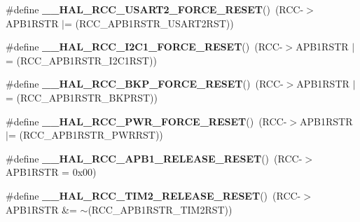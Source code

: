 \begin{DoxyCompactItemize}
\mbox{\label{group___r_c_c___a_p_b1___force___release___reset_gab4de80173ffa0e599baab0e76d562cc3}} 
\#define {\bfseries \+\_\+\+\_\+\+H\+A\+L\+\_\+\+R\+C\+C\+\_\+\+U\+S\+A\+R\+T2\+\_\+\+F\+O\+R\+C\+E\+\_\+\+R\+E\+S\+ET}()~(R\+CC-\/$>$A\+P\+B1\+R\+S\+TR $\vert$= (R\+C\+C\+\_\+\+A\+P\+B1\+R\+S\+T\+R\+\_\+\+U\+S\+A\+R\+T2\+R\+ST))
\item 
\mbox{\label{group___r_c_c___a_p_b1___force___release___reset_ga551c171f88af86ca985db634ac9e3275}} 
\#define {\bfseries \+\_\+\+\_\+\+H\+A\+L\+\_\+\+R\+C\+C\+\_\+\+I2\+C1\+\_\+\+F\+O\+R\+C\+E\+\_\+\+R\+E\+S\+ET}()~(R\+CC-\/$>$A\+P\+B1\+R\+S\+TR $\vert$= (R\+C\+C\+\_\+\+A\+P\+B1\+R\+S\+T\+R\+\_\+\+I2\+C1\+R\+ST))
\item 
\mbox{\label{group___r_c_c___a_p_b1___force___release___reset_ga570b0786a7446c63fd268cb0466f8af3}} 
\#define {\bfseries \+\_\+\+\_\+\+H\+A\+L\+\_\+\+R\+C\+C\+\_\+\+B\+K\+P\+\_\+\+F\+O\+R\+C\+E\+\_\+\+R\+E\+S\+ET}()~(R\+CC-\/$>$A\+P\+B1\+R\+S\+TR $\vert$= (R\+C\+C\+\_\+\+A\+P\+B1\+R\+S\+T\+R\+\_\+\+B\+K\+P\+R\+ST))
\item 
\mbox{\label{group___r_c_c___a_p_b1___force___release___reset_gaf454341fae45fdfacfea2f45c07ce3e0}} 
\#define {\bfseries \+\_\+\+\_\+\+H\+A\+L\+\_\+\+R\+C\+C\+\_\+\+P\+W\+R\+\_\+\+F\+O\+R\+C\+E\+\_\+\+R\+E\+S\+ET}()~(R\+CC-\/$>$A\+P\+B1\+R\+S\+TR $\vert$= (R\+C\+C\+\_\+\+A\+P\+B1\+R\+S\+T\+R\+\_\+\+P\+W\+R\+R\+ST))
\item 
\mbox{\label{group___r_c_c___a_p_b1___force___release___reset_ga9d0742ab271ace3dbe1a4e83de3d017b}} 
\#define {\bfseries \+\_\+\+\_\+\+H\+A\+L\+\_\+\+R\+C\+C\+\_\+\+A\+P\+B1\+\_\+\+R\+E\+L\+E\+A\+S\+E\+\_\+\+R\+E\+S\+ET}()~(R\+CC-\/$>$A\+P\+B1\+R\+S\+TR = 0x00)
\item 
\mbox{\label{group___r_c_c___a_p_b1___force___release___reset_ga4b1b3b45c95788edb29ccd2bf6994826}} 
\#define {\bfseries \+\_\+\+\_\+\+H\+A\+L\+\_\+\+R\+C\+C\+\_\+\+T\+I\+M2\+\_\+\+R\+E\+L\+E\+A\+S\+E\+\_\+\+R\+E\+S\+ET}()~(R\+CC-\/$>$A\+P\+B1\+R\+S\+TR \&= $\sim$(R\+C\+C\+\_\+\+A\+P\+B1\+R\+S\+T\+R\+\_\+\+T\+I\+M2\+R\+ST))

\end{DoxyCompactItemize}
